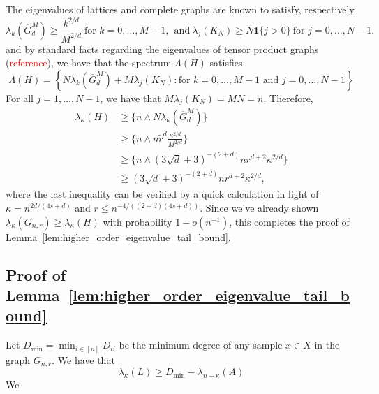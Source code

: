 \documentclass{article}
\newcommand{\set}[1]{\left\{#1\right\}}
\newcommand{\1}{\mathbf{1}}
\newcommand{\wt}[1]{\widetilde{#1}}
\newcommand{\ol}[1]{\overline{#1}}
\theoremstyle{alden}
\theoremstyle{aldenthm}
\theoremstyle{definition}
\theoremstyle{remark}
\begin{document}
The eigenvalues of lattices and complete graphs are known to satisfy, respectively
\begin{equation*}
\lambda_k(\ol{G}^{M}_d) \geq \frac{k^{2/d}}{M^{2/d}}~\textrm{for $k = 0,\ldots,M - 1$},~~ \textrm{and}~\lambda_{j}(K_N) \geq N\1\{j > 0\}~\textrm{for $j = 0,\ldots,N-1$.}
\end{equation*}
and by standard facts regarding the eigenvalues of tensor product graphs (\textcolor{red}{reference}), we have that the spectrum $\Lambda(H)$ satisfies
\begin{equation*}
\Lambda(H) = \set{N\lambda_k(\ol{G}^{M}_d) + M\lambda_j(K_N): \textrm{for $k = 0,\ldots,M - 1$ and $j = 0,\ldots,N-1$}}
\end{equation*}
For all $j = 1,\ldots,N-1$, we have that $M\lambda_j(K_N) = MN = n$. Therefore,
\begin{align*}
\lambda_{\kappa}(H) & \geq \{n \wedge N\lambda_{\kappa}(\ol{G}^{M}_d)\} \\
& \geq \{n \wedge n\wt{r}^d\frac{\kappa^{2/d}}{M^{2/d}}\} \\
& \geq \{n \wedge (3\sqrt{d} + 3)^{-(2+d)}nr^{d+2}\kappa^{2/d}\} \\
& \geq (3\sqrt{d} + 3)^{-(2+d)}nr^{d+2}\kappa^{2/d},
\end{align*}
where the last inequality can be verified by a quick calculation in light of $\kappa = n^{2d/(4s + d)}$ and $r \leq n^{-4/((2+d)(4s + d))}$. Since we've already shown $\lambda_{\kappa}(G_{n,r}) \geq \lambda_{\kappa}(H)$ with probability $1 - o(n^{-1})$, this completes the proof of Lemma~\ref{lem:higher_order_eigenvalue_tail_bound}. 

\subsection{Proof of Lemma~\ref{lem:higher_order_eigenvalue_tail_bound}}

Let $D_{\min} = \min_{i \in [n]} D_{ii}$ be the minimum degree of any sample $x \in X$ in the graph $G_{n,r}$. We have that
\begin{equation*}
\lambda_{\kappa}(L) \geq D_{\min} - \lambda_{n - \kappa}(A)
\end{equation*}
We 
\end{document}
